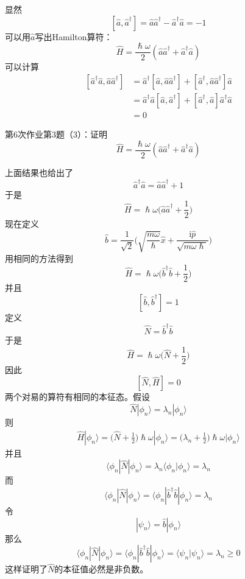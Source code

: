         显然
        \[ [\hat{a},\hat{a}^\dagger] = \hat{a}\hat{a}^\dagger - \hat{a}^\dagger \hat{a} =  -1 \]
        可以用$\hat{a}$写出Hamilton算符：
        \[ \hat{H} = \frac {\hslash \omega}2 (\hat{a}\hat{a}^\dagger + \hat{a}^\dagger \hat{a}) \]
        可以计算
        \begin{equation}\begin{aligned}
            [\hat{a}^\dagger\hat{a}, \hat{a}\hat{a}^\dagger] &= \hat{a}^\dagger [\hat{a},\hat{a}\hat{a}^\dagger] +  [\hat{a}^\dagger,\hat{a}\hat{a}^\dagger]\hat{a}\\
            &= \hat{a}^\dagger\hat{a}[\hat{a},\hat{a}^\dagger] + [\hat{a}^\dagger,\hat{a}]\hat{a}^\dagger \hat{a}\\
            &= 0
        \end{aligned}\end{equation}
        \begin{asg}
            第6次作业第3题（3）：证明
            \[ \hat{H} = \frac {\hslash \omega}2 (\hat{a}\hat{a}^\dagger + \hat{a}^\dagger \hat{a}) \]
        \end{asg}
        上面结果也给出了
        \[ \hat{a}^\dagger\hat{a} = \hat{a}\hat{a}^\dagger + 1 \]
        于是
        \[ \hat{H} = \hslash \omega\bigg(\hat{a}\hat{a}^\dagger + \frac 12\bigg)\]
        现在定义
        \[ \hat{b} = \frac 1{\sqrt{2}}\bigg(\sqrt{\frac {m\omega}{\hslash}}\hat{x} + \frac {\mathrm{i}\hat{p}}{\sqrt{m\omega\hslash}}\bigg) \]
        用相同的方法得到 
        \[ \hat{H} = \hslash \omega\bigg(\hat{b}^\dagger\hat{b}+ \frac 12\bigg) \]
        并且
        \[ [\hat{b}, \hat{b}^\dagger] = 1 \]
        定义
        \[ \hat{N} = \hat{b}^\dagger\hat{b} \]
        于是
        \[ \hat{H} = \hslash \omega \bigg(\hat{N}+\frac 12\bigg) \]
        因此 
        \[ [\hat{N},\hat{H}] = 0 \]
        两个对易的算符有相同的本征态。假设
        \[ \hat{N}|\phi_n \rangle = \lambda_n |\phi_n \rangle \]
        则
        \begin{equation}\begin{aligned}
            \hat{H}|\phi_n \rangle = \bigg(\hat{N}+\frac 12\bigg)\hslash\omega|\phi_n \rangle = \bigg(\lambda_n + \frac 12\bigg)\hslash\omega|\phi_n\rangle
        \end{aligned}\end{equation}
        并且
        \[ \langle \phi_n|\hat{N}|\phi_n \rangle = \lambda_n \langle \phi_n |\phi_n \rangle = \lambda_n \]
        而
        \[ \langle \phi_n|\hat{N}|\phi_n \rangle =  \langle \phi_n |\hat{b}^\dagger\hat{b}|\phi_n \rangle = \lambda_n \]
        令
        \[ |\psi_n \rangle = \hat{b}|\phi_n\rangle \]
        那么
        \[ \langle \phi_n|\hat{N}|\phi_n \rangle =  \langle \phi_n |\hat{b}^\dagger\hat{b}|\phi_n \rangle = \langle \psi_n|\psi_n \rangle = \lambda_n \geqslant 0 \]
        这样证明了$\hat{N}$的本征值必然是非负数。

